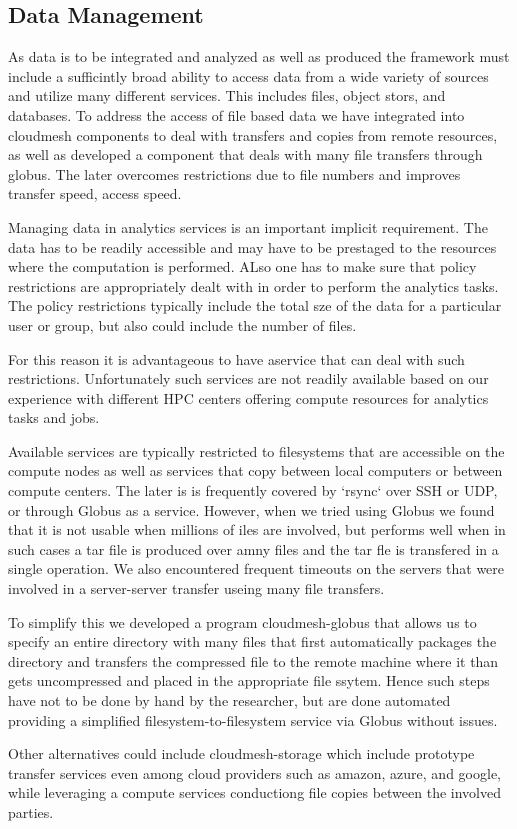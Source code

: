 \subsection{Data Management}
\label{sec:data}

As data is to be integrated and analyzed as well as produced the
framework must include a sufficintly broad ability to access data from
a wide variety of sources and utilize many different services.  This
includes files, object stors, and databases.  To address the access of
file based data we have integrated into cloudmesh components to deal
with transfers and copies from remote resources, as well as developed
a component that deals with many file transfers through globus. The
later overcomes restrictions due to file numbers and improves transfer
speed, access speed.

Managing data in analytics services is an important implicit
requirement. The data has to be readily accessible and may have to be
prestaged to the resources where the computation is performed. ALso
one has to make sure that policy restrictions are appropriately dealt
with in order to perform the analytics tasks. The policy restrictions
typically include the total sze of the data for a particular user or
group, but also could include the number of files.

For this reason it is advantageous to have aservice that can deal with
such restrictions. Unfortunately such services are not readily
available based on our experience with different HPC centers offering
compute resources for analytics tasks and jobs.

Available services are typically restricted to filesystems that are
accessible on the compute nodes as well as services that copy between
local computers or between compute centers. The later is is frequently
covered by `rsync` over SSH or UDP, or through
Globus \cite{www-globus-transfer} as a service. However, when we tried
using Globus we found that it is not usable when millions of iles are
involved, but performs well when in such cases a tar file is produced
over amny files and the tar fle is transfered in a single
operation. We also encountered frequent timeouts on the servers that
were involved in a server-server transfer useing many file transfers.

To simplify this we developed a program
cloudmesh-globus \cite{cloudmesh-globus} that allows us to specify an
entire directory with many files that first automatically packages the
directory and transfers the compressed file to the remote machine
where it than gets uncompressed and placed in the appropriate file
ssytem. Hence such steps have not to be done by hand by the
researcher, but are done automated providing a simplified
filesystem-to-filesystem service via Globus without issues.

Other alternatives could include
cloudmesh-storage \cite{cloudmesh-storage} which include prototype
transfer services even among cloud providers such as amazon, azure,
and google, while leveraging a compute services conductiong file
copies between the involved parties.



